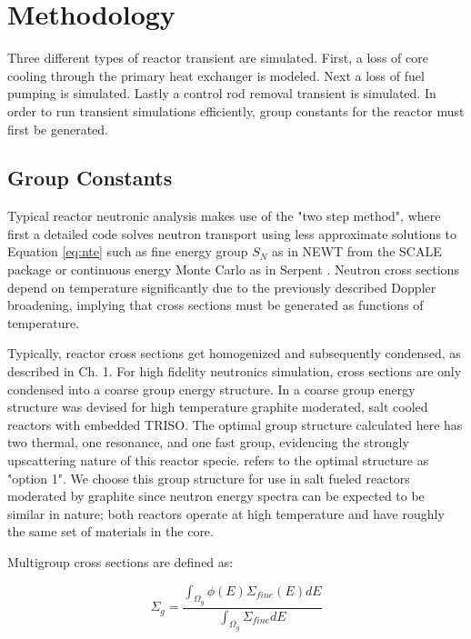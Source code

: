 \section{Methodology}

Three different types of reactor transient are simulated. First, a loss of core cooling through the primary heat exchanger is modeled. Next a loss of fuel pumping is simulated. Lastly a control rod removal transient is simulated. In order to run transient simulations efficiently, group constants for the reactor must first be generated. 

\subsection{Group Constants}
Typical reactor neutronic analysis makes use of the "two step method", where first a detailed code solves neutron transport using less approximate solutions to Equation \ref{eq:nte} such as fine energy group $S_N$ as in NEWT from the SCALE package \cite{kim_unstructured_2011} or continuous energy Monte Carlo as in Serpent \cite{serp}. Neutron cross sections depend on temperature significantly due to the previously described Doppler broadening, implying that cross sections must be generated as functions of temperature.

Typically, reactor cross sections get homogenized and subsequently condensed, as described in \cite{stammler_methods_1983} Ch. 1. 
For high fidelity neutronics simulation, cross sections are only condensed into a coarse group energy structure. In \cite{gentry} a coarse group energy structure was devised for high temperature graphite moderated, salt cooled reactors with embedded TRISO. The optimal group structure calculated here has two thermal, one resonance, and one fast group, evidencing the strongly upscattering nature of this reactor specie. \cite{gentry} refers to the optimal structure as "option 1". We choose this group structure for use in salt fueled reactors moderated by graphite since neutron energy spectra can be expected to be similar in nature; both reactors operate at high temperature and have roughly the same set of materials in the core.

Multigroup cross sections are defined as:

\begin{equation}
\Sigma_g = \frac{\int_{\Omega_g} \phi(E) \Sigma_{fine}(E) dE}{\int_{\Omega_g} \Sigma_{fine} dE}
\end{equation}

